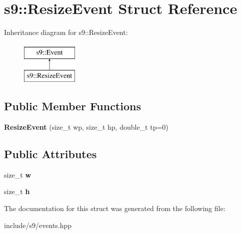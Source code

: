 \hypertarget{structs9_1_1ResizeEvent}{\section{s9\-:\-:Resize\-Event Struct Reference}
\label{structs9_1_1ResizeEvent}
}
Inheritance diagram for s9\-:\-:Resize\-Event\-:\begin{figure}[H]
\begin{center}
\leavevmode
\includegraphics[height=2.000000cm]{structs9_1_1ResizeEvent}
\end{center}
\end{figure}
\subsection*{Public Member Functions}
\begin{DoxyCompactItemize}
\item 
\hypertarget{structs9_1_1ResizeEvent_a951885563e1fffa3c84691feb0ffe430}{{\bfseries Resize\-Event} (size\-\_\-t wp, size\-\_\-t hp, double\-\_\-t tp=0)}\label{structs9_1_1ResizeEvent_a951885563e1fffa3c84691feb0ffe430}

\end{DoxyCompactItemize}
\subsection*{Public Attributes}
\begin{DoxyCompactItemize}
\item 
\hypertarget{structs9_1_1ResizeEvent_a3d550f893627c92f770895e2b03572fd}{size\-\_\-t {\bfseries w}}\label{structs9_1_1ResizeEvent_a3d550f893627c92f770895e2b03572fd}

\item 
\hypertarget{structs9_1_1ResizeEvent_ac0e84e02ec037d1bbbd206a276365e27}{size\-\_\-t {\bfseries h}}\label{structs9_1_1ResizeEvent_ac0e84e02ec037d1bbbd206a276365e27}

\end{DoxyCompactItemize}


The documentation for this struct was generated from the following file\-:\begin{DoxyCompactItemize}
\item 
include/s9/events.\-hpp\end{DoxyCompactItemize}
